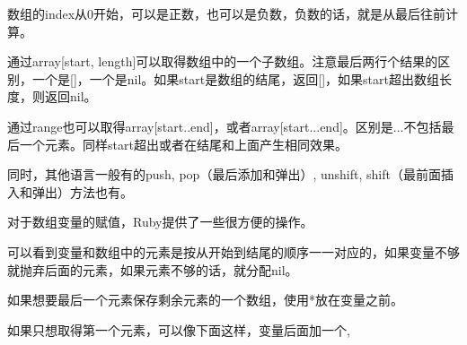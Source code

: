 


数组的index从0开始，可以是正数，也可以是负数，负数的话，就是从最后往前计算。



通过array[start, length]可以取得数组中的一个子数组。注意最后两行个结果的区别，一个是[]，一个是nil。如果start是数组的结尾，返回[]，如果start超出数组长度，则返回nil。



通过range也可以取得array[start..end]，或者array[start...end]。区别是...不包括最后一个元素。同样start超出或者在结尾和上面产生相同效果。



同时，其他语言一般有的push, pop（最后添加和弹出）, unshift, shift（最前面插入和弹出）方法也有。





对于数组变量的赋值，Ruby提供了一些很方便的操作。



可以看到变量和数组中的元素是按从开始到结尾的顺序一一对应的，如果变量不够就抛弃后面的元素，如果元素不够的话，就分配nil。






如果想要最后一个元素保存剩余元素的一个数组，使用*放在变量之前。



如果只想取得第一个元素，可以像下面这样，变量后面加一个,

